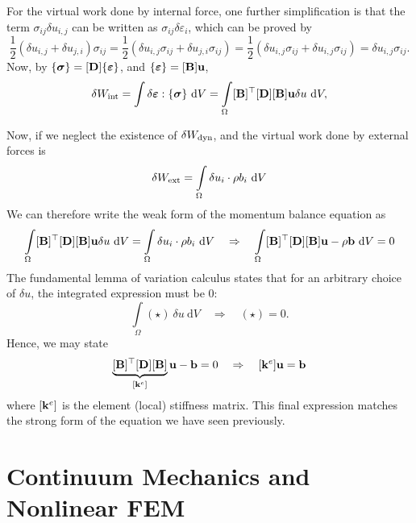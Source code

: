 \documentclass[12pt, a4paper]{article}
\numberwithin{equation}{section}
\begin{document}
For the virtual work done by internal force, one further simplification is that the term $\sigma_{ij} \delta u_{i,j}$ can be written as $\sigma_{ij} \delta \varepsilon_i$, which can be proved by
\begin{equation}
    \frac{1}{2} (\delta u_{i,j} + \delta u_{j,i}) \sigma_{ij} = \frac{1}{2} (\delta u_{i,j} \sigma_{ij} + \delta u_{j,i} \sigma_{ij}) = \frac{1}{2} (\delta u_{i,j} \sigma_{ij} + \delta u_{i,j} \sigma_{ij}) = \delta u_{i,j} \sigma_{ij}.
\end{equation}
Now, by $\{\boldsymbol{\sigma}\} = [\mathbf{D}] \{\boldsymbol{\varepsilon}\}$, and $\{\boldsymbol{\varepsilon}\} = [\mathbf{B}] \mathbf{u}$,
\begin{equation}
\label{eqn:int_energy_weak}
    \delta W_{\rm int} 
    = \int \delta \boldsymbol{\varepsilon} : \stress \ \mathrm{d}V
    = \int \limits_\Omega \B^\top \D \B \bu \delta u \ \mathrm{d}V, 
\end{equation}

Now, if we neglect the existence of $\delta W_{\rm dyn}$, and the virtual work done by external forces is 
\begin{equation}
    \delta W_{\rm ext} = \int \limits_\Omega \delta u_{i} \cdot \rho b_i\  \mathrm{d}V
\end{equation}
We can therefore write the weak form of the momentum balance equation as
\begin{equation}
    \int \limits_\Omega \B^\top \D \B \bu \delta u \ \mathrm{d}V = \int \limits_\Omega \delta u_{i} \cdot \rho b_i\  \mathrm{d}V 
    \quad \Rightarrow \quad
    \int \limits_\Omega \B^\top \D \B \bu - \rho \mathbf{b} \ \mathrm{d}V = 0
\end{equation}
The fundamental lemma of variation calculus states that for an arbitrary choice of $\delta u$, the integrated expression must be 0:
\[
    \int \limits_\Omega (\star) \ \delta u \ \mathrm{d}V  \quad \Rightarrow \quad (\star) = 0.
\]
Hence, we may state 
\begin{equation}
     \underbrace{[\mathbf{B}]^\top [\mathbf{D}] [\mathbf{B}]}_{[\mathbf{k}^e]} \mathbf{u} - \mathbf{b} = 0 \quad \Rightarrow \quad
     [\mathbf{k}^e] \mathbf{u} =  \mathbf{b}
\end{equation}
where $[\mathbf{k}^e]$ is the element (local) stiffness matrix. This final expression matches the strong form of the equation we have seen previously.

\newpage
\section{Continuum Mechanics and Nonlinear FEM}
\end{document}

